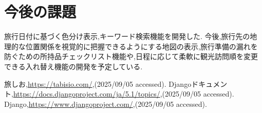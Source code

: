 \documentclass[a4j,twocolumn]{jsarticle}
\begin{document}
\section{今後の課題}
\label{sec:org11701f7}
旅行日付に基づく色分け表示,キーワード検索機能を開発した.
今後,旅行先の地理的な位置関係を視覚的に把握できるようにする地図の表示,旅行準備の漏れを防ぐための所持品チェックリスト機能や,日程に応じて柔軟に観光訪問順を変更できる入れ替え機能の開発を予定している.




\small\setlength\baselineskip{10pt}
\begin{thebibliography}{9}

 旅しお,\url{https://tabisio.com/},(2025/09/05 accessed).
Djangoドキュメント,\url{https://docs.djangoproject.com/ja/5.1/topics/},(2025/09/05 accessed).
Django,\url{https://www.djangoproject.com/},(2025/09/05 accessed).
\end{thebibliography}
\end{document}
